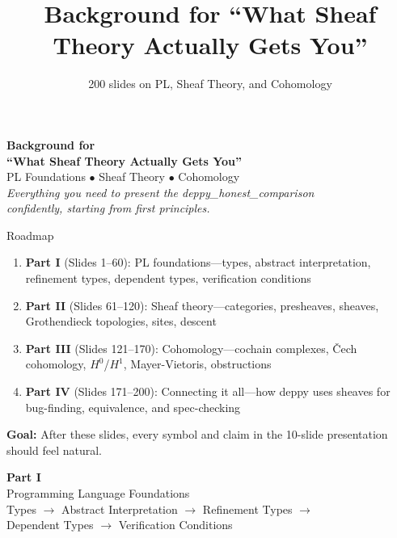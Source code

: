 \documentclass[aspectratio=169,10pt]{beamer}
\title{Background for ``What Sheaf Theory Actually Gets You''}
\subtitle{200 slides on PL, Sheaf Theory, and Cohomology}
\author{}
\date{}
\begin{document}

\begin{frame}[plain]
\vspace{1.5cm}
\begin{center}
{\Large\textbf{Background for\\``What Sheaf Theory Actually Gets You''}}\\[0.5em]
{\normalsize PL Foundations $\bullet$ Sheaf Theory $\bullet$ Cohomology}\\[1em]
{\small\textit{Everything you need to present the deppy\_honest\_comparison\\
confidently, starting from first principles.}}
\end{center}
\end{frame}

\begin{frame}{Roadmap}
\begin{enumerate}
  \item \textbf{Part I} (Slides 1--60): PL foundations---types, abstract interpretation, refinement types, dependent types, verification conditions
  \item \textbf{Part II} (Slides 61--120): Sheaf theory---categories, presheaves, sheaves, Grothendieck topologies, sites, descent
  \item \textbf{Part III} (Slides 121--170): Cohomology---cochain complexes, \v{C}ech cohomology, $H^0$/$H^1$, Mayer-Vietoris, obstructions
  \item \textbf{Part IV} (Slides 171--200): Connecting it all---how deppy uses sheaves for bug-finding, equivalence, and spec-checking
\end{enumerate}

\vspace{0.5em}
\textcolor{honest}{\textbf{Goal:}} After these slides, every symbol and claim in the 10-slide presentation should feel natural.
\end{frame}


\begin{frame}[plain]
\begin{center}
\vspace{2cm}
{\Huge\textbf{Part I}}\\[0.3em]
{\Large Programming Language Foundations}\\[1em]
{\normalsize Types $\to$ Abstract Interpretation $\to$ Refinement Types $\to$\\
 Dependent Types $\to$ Verification Conditions}
\end{center}
\end{frame}
\end{document}
